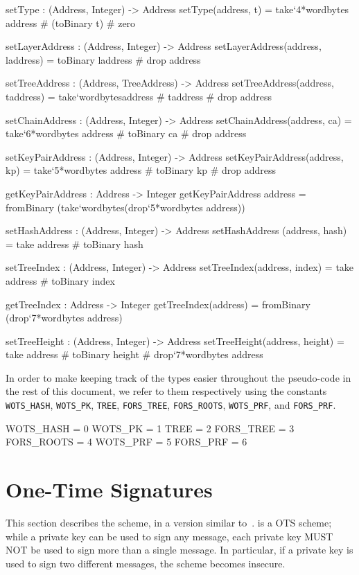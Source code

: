 \begin{code}
  setType : (Address, Integer) -> Address
  setType(address, t) = take`{4*wordbytes} address # (toBinary t) # zero

  setLayerAddress : (Address, Integer) -> Address
  setLayerAddress(address, laddress) = toBinary laddress # drop address

  setTreeAddress : (Address, TreeAddress) -> Address
  setTreeAddress(address, taddress) =
      take`{wordbytes}address # taddress # drop address

  setChainAddress : (Address, Integer) -> Address
  setChainAddress(address, ca) =
      take`{6*wordbytes} address # toBinary ca # drop address

  setKeyPairAddress : (Address, Integer) -> Address
  setKeyPairAddress(address, kp) =
      take`{5*wordbytes} address # toBinary kp # drop address

  getKeyPairAddress : Address -> Integer
  getKeyPairAddress address =
    fromBinary (take`{wordbytes}(drop`{5*wordbytes} address))

  setHashAddress : (Address, Integer) -> Address
  setHashAddress (address, hash) = take address # toBinary hash

  setTreeIndex : (Address, Integer) -> Address
  setTreeIndex(address, index) = take address # toBinary index

  getTreeIndex : Address -> Integer
  getTreeIndex(address) = fromBinary (drop`{7*wordbytes} address)

  setTreeHeight : (Address, Integer) -> Address
  setTreeHeight(address, height) =
      take address # toBinary height # drop`{7*wordbytes} address
\end{code}

   In order to make keeping track of the types easier throughout the pseudo-code in
   the rest of this document, we refer to them respectively using the constants
   \texttt{WOTS\_HASH}, \texttt{WOTS\_PK}, \texttt{TREE}, \texttt{FORS\_TREE}, \texttt{FORS\_ROOTS}, \texttt{WOTS\_PRF}, and \texttt{FORS\_PRF}.

\begin{code}
  WOTS_HASH  = 0
  WOTS_PK    = 1
  TREE       = 2
  FORS_TREE  = 3
  FORS_ROOTS = 4
  WOTS_PRF   = 5
  FORS_PRF   = 6
\end{code}


\section{\wotsp One-Time Signatures}\label{sec:wots}
This section describes the \wotsp scheme, in a version similar
to~\cite{Hulsing2013}. \wotsp is a OTS scheme; while a private key can be used
to sign any message, each private key MUST NOT be used to sign more than a single
message. In particular, if a private key is used to sign two different messages,
the scheme becomes insecure.


